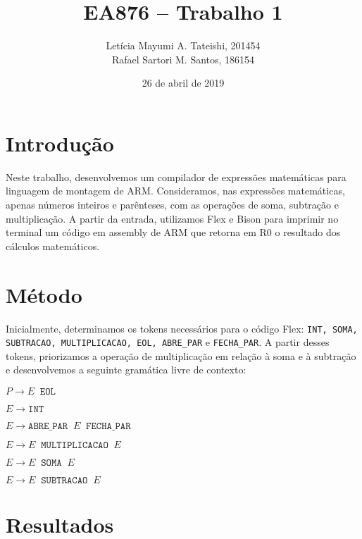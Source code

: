 \documentclass[brazilian,a4paper,twocolumn]{article}
\title{EA876 -- Trabalho 1}
\author{Letícia Mayumi A. Tateishi, 201454 \\Rafael Sartori M. Santos, 186154}
\date{26 de abril de 2019}
\newcommand{\s}{\;\;}
\begin{document}
\maketitle

\section{Introdução}

    Neste trabalho, desenvolvemos um compilador de expressões matemáticas para linguagem de montagem de ARM. Consideramos, nas expressões matemáticas, apenas números inteiros e parênteses, com as operações de soma, subtração e multiplicação. A partir da entrada, utilizamos Flex e Bison para imprimir no terminal um código em assembly de ARM que retorna em R0 o resultado dos cálculos matemáticos.
    
\section{Método}
    
    Inicialmente, determinamos os tokens necessários para o código Flex: \texttt{INT, SOMA, SUBTRACAO, MULTIPLICACAO, EOL, ABRE\_PAR} e \texttt{FECHA\_PAR}. A partir desses tokens, priorizamos a operação de multiplicação em relação à soma e à subtração e desenvolvemos a seguinte gramática livre de contexto:
    
    $P \xrightarrow{} E \s \texttt{EOL}$
    
    $E \xrightarrow{} \texttt{INT}$
    
    $E \xrightarrow{} \texttt{ABRE\_PAR} \s E \s \texttt{FECHA\_PAR}$
    
    $E \xrightarrow{} E \s \texttt{MULTIPLICACAO} \s E$
    
    $E \xrightarrow{} E \s \texttt{SOMA} \s E$
    
    $E \xrightarrow{} E \s \texttt{SUBTRACAO} \s E$
    

    
\section{Resultados}
\end{document}
